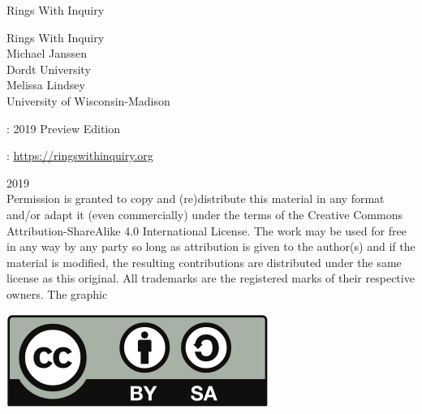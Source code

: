 \documentclass[oneside,10pt,]{book}
\newcommand{\titlepagefont}{\relax}
\numberwithin{equation}{section}
\begin{document}
\frontmatter
\thispagestyle{empty}
{\titlepagefont\centering
\vspace*{0.28\textheight}
{\Huge Rings With Inquiry}\\}
\clearpage
\thispagestyle{empty}
\null%
\clearpage
\thispagestyle{empty}
{\titlepagefont\centering
\vspace*{0.14\textheight}
{\Huge Rings With Inquiry}\\[3\baselineskip]
{\Large Michael Janssen}\\[0.5\baselineskip]
{\Large Dordt University}\\[3\baselineskip]
{\Large Melissa Lindsey}\\[0.5\baselineskip]
{\Large University of Wisconsin-Madison}\\}
\clearpage
\thispagestyle{empty}
\hypertarget{g:colophon:idm317252938672}{}
: 2019 Preview Edition\par\medskip
{}: \href{https:\slash{}\slash{}ringswithinquiry.org}{https:\slash{}\slash{}ringswithinquiry.org}\par\medskip
\noindent\textcopyright{}2019\textendash{}\quad{}\\[0.5\baselineskip]
Permission is granted to copy and (re)distribute this material in any format and\slash{}or adapt it (even commercially) under the terms of the Creative Commons Attribution-ShareAlike 4.0 International License.  The work may be used for free in any way by any party so long as attribution is given to the author(s) and if the material is modified, the resulting contributions are distributed under the same license as this original.  All trademarks\texttrademark{} are the registered\textregistered{} marks of their respective owners. The graphic \begin{sidebyside}{1}{0.375}{0.375}{0}%
\begin{sbspanel}{0.25}%
\includegraphics[width=\linewidth]{./images/CC-BY-SA-license.svg}
\end{sbspanel}%
\end{sidebyside}%
\end{document}
